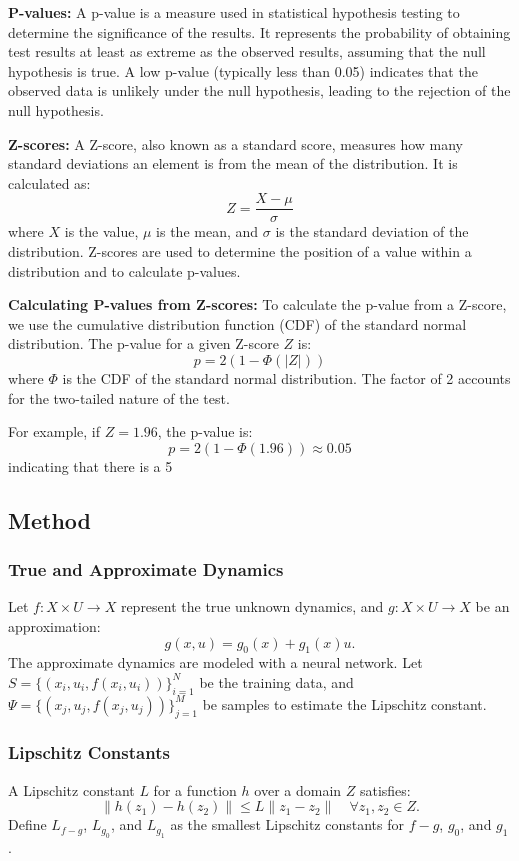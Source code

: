 \documentclass{article}
\begin{document}
\textbf{P-values:} A p-value is a measure used in statistical hypothesis testing to determine the significance of the results. It represents the probability of obtaining test results at least as extreme as the observed results, assuming that the null hypothesis is true. A low p-value (typically less than 0.05) indicates that the observed data is unlikely under the null hypothesis, leading to the rejection of the null hypothesis.

\textbf{Z-scores:} A Z-score, also known as a standard score, measures how many standard deviations an element is from the mean of the distribution. It is calculated as:
\[
Z = \frac{X - \mu}{\sigma}
\]
where \( X \) is the value, \( \mu \) is the mean, and \( \sigma \) is the standard deviation of the distribution. Z-scores are used to determine the position of a value within a distribution and to calculate p-values.

\textbf{Calculating P-values from Z-scores:}
To calculate the p-value from a Z-score, we use the cumulative distribution function (CDF) of the standard normal distribution. The p-value for a given Z-score \( Z \) is:
\[
p = 2 \left( 1 - \Phi(|Z|) \right)
\]
where \( \Phi \) is the CDF of the standard normal distribution. The factor of 2 accounts for the two-tailed nature of the test.

For example, if \( Z = 1.96 \), the p-value is:
\[
p = 2 \left( 1 - \Phi(1.96) \right) \approx 0.05
\]
indicating that there is a 5%

\subsection{Method}
\subsubsection{True and Approximate Dynamics}
Let \( f : X \times U \to X \) represent the true unknown dynamics, and \( g : X \times U \to X \) be an approximation:
\[
g(x, u) = g_0(x) + g_1(x)u.
\]
The approximate dynamics are modeled with a neural network. Let \( S = \{(x_i, u_i, f(x_i, u_i))\}_{i=1}^N \) be the training data, and \( \Psi = \{(x_j, u_j, f(x_j, u_j))\}_{j=1}^M \) be samples to estimate the Lipschitz constant.

\subsubsection{Lipschitz Constants}
A Lipschitz constant \( L \) for a function \( h \) over a domain \( Z \) satisfies:
\[
\|h(z_1) - h(z_2)\| \leq L \|z_1 - z_2\| \quad \forall z_1, z_2 \in Z.
\]
Define \( L_{f-g} \), \( L_{g_0} \), and \( L_{g_1} \) as the smallest Lipschitz constants for \( f - g \), \( g_0 \), and \( g_1 \).
\end{document}
